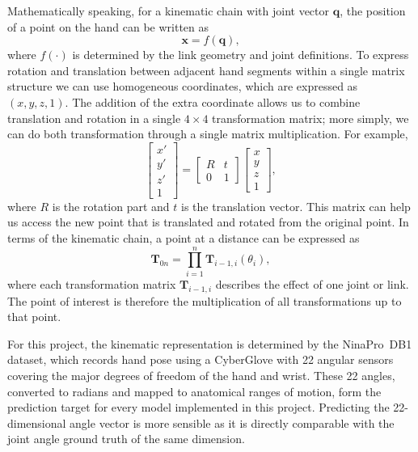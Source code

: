 \documentclass[11pt]{article}
\begin{document}
Mathematically speaking, for a kinematic chain with joint vector $\mathbf{q}$, the position of a point on the hand can be written as
\begin{equation}
\mathbf{x} = f(\mathbf{q}),
\end{equation}
where $f(\cdot)$ is determined by the link geometry and joint definitions. To express rotation and translation between adjacent hand segments within a single matrix structure we can use homogeneous coordinates, which are expressed as $(x, y, z, 1)$. The addition of the extra coordinate allows us to combine translation and rotation in a single $4 \times 4$ transformation matrix; more simply, we can do both transformation through a single matrix multiplication. For example,
\begin{equation}
\begin{bmatrix} x' \\ y' \\ z' \\ 1 \end{bmatrix}
=
\begin{bmatrix} R & t \\ 0 & 1 \end{bmatrix}
\begin{bmatrix} x \\ y \\ z \\ 1 \end{bmatrix},
\end{equation}
where $R$ is the rotation part and $t$ is the translation vector. This matrix can help us access the new point that is translated and rotated from the original point. In terms of the kinematic chain, a point at a distance can be expressed as
\begin{equation}
\mathbf{T}_{0n} = \prod_{i=1}^{n} \mathbf{T}_{i-1,i}(\theta_i),
\end{equation}
where each transformation matrix $\mathbf{T}_{i-1,i}$ describes the effect of one joint or link. The point of interest is therefore the multiplication of all transformations up to that point.

For this project, the kinematic representation is determined by the NinaPro~DB1 dataset, which records hand pose using a CyberGlove with 22 angular sensors covering the major degrees of freedom of the hand and wrist. These 22 angles, converted to radians and mapped to anatomical ranges of motion, form the prediction target for every model implemented in this project. Predicting the 22-dimensional angle vector is more sensible as it is directly comparable with the joint angle ground truth of the same dimension.
\end{document}
